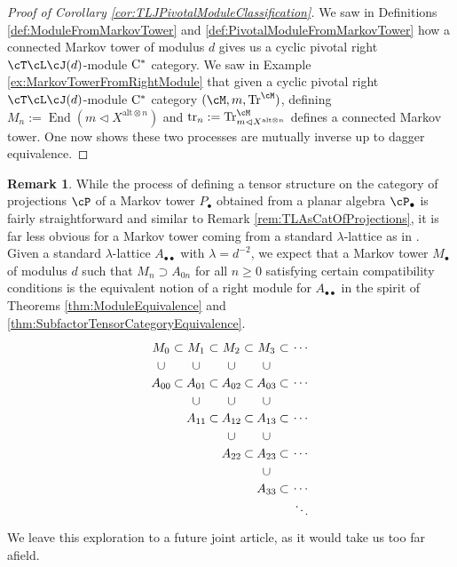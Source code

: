 \documentclass[11pt]{article}
\theoremstyle{plain}
\theoremstyle{definition}
\newtheorem{rem}[thm]{Remark}
\DeclareMathOperator{\End}{End}
\DeclareMathOperator{\Tr}{Tr}
\DeclareMathOperator{\tr}{tr}
\newcommand{\Cstar}{\rm{C^*}}
\begin{document}
\begin{proof}[Proof of Corollary \ref{cor:TLJPivotalModuleClassification}]
We saw in Definitions \ref{def:ModuleFromMarkovTower} and \ref{def:PivotalModuleFromMarkovTower} how a connected Markov tower of modulus $d$ gives us a cyclic pivotal right $\cT\cL\cJ(d)$-module $\Cstar$ category.
We saw in Example \ref{ex:MarkovTowerFromRightModule} that given a cyclic pivotal right $\cT\cL\cJ(d)$-module $\Cstar$ category $(\cM, m,\Tr^\cM)$, 
defining $M_n := \End(m \vartriangleleft X^{\text{alt}\otimes n})$ and $\tr_n := \Tr^\cM_{m \vartriangleleft X^{\text{alt}\otimes n}}$ defines a connected Markov tower.
One now shows these two processes are mutually inverse up to dagger equivalence.
\end{proof}


\begin{rem}
\label{rem:LambdaLatticeModule}
While the process of defining a tensor structure on the category of projections $\cP$ of a Markov tower $P_\bullet$ obtained from a planar algebra $\cP_\bullet$ is fairly straightforward and similar to Remark \ref{rem:TLAsCatOfProjections}, 
it is far less obvious for a Markov tower coming from a standard $\lambda$-lattice as in \cite{MR1334479}.
Given a standard $\lambda$-lattice $A_{\bullet\bullet}$ with $\lambda = d^{-2}$, we expect that a Markov tower $M_\bullet$ of modulus $d$ such that $M_n \supset A_{0n}$ for all $n\geq 0$ satisfying certain compatibility conditions is the equivalent notion of a right module for $A_{\bullet\bullet}$ in the spirit of Theorems \ref{thm:ModuleEquivalence} and \ref{thm:SubfactorTensorCategoryEquivalence}.
$$
\begin{tikzpicture}
 \node at (0,1) {$M_{0}$};
 \node at (.5,1) {$\subset$};
 \node at (1,1) {$M_{1}$};
 \node at (1.5,1) {$\subset$};
 \node at (2,1) {$M_{2}$};
 \node at (2.5,1) {$\subset$};
 \node at (3,1) {$M_{3}$};
 \node at (3.5,1) {$\subset$};
 \node at (4,1) {$\cdots$};
%
 \node at (0,.5) {$\cup$};
 \node at (1,.5) {$\cup$};
 \node at (2,.5) {$\cup$};
 \node at (3,.5) {$\cup$};
%
 \node at (0,0) {$A_{00}$};
 \node at (.5,0) {$\subset$};
 \node at (1,0) {$A_{01}$};
 \node at (1.5,0) {$\subset$};
 \node at (2,0) {$A_{02}$};
 \node at (2.5,0) {$\subset$};
 \node at (3,0) {$A_{03}$};
 \node at (3.5,0) {$\subset$};
 \node at (4,0) {$\cdots$};
%
 \node at (1,-.5) {$\cup$};
 \node at (2,-.5) {$\cup$};
 \node at (3,-.5) {$\cup$};
%
 \node at (1,-1) {$A_{11}$};
 \node at (1.5,-1) {$\subset$};
 \node at (2,-1) {$A_{12}$};
 \node at (2.5,-1) {$\subset$};
 \node at (3,-1) {$A_{13}$};
 \node at (3.5,-1) {$\subset$};
 \node at (4,-1) {$\cdots$};
%
 \node at (2,-1.5) {$\cup$};
 \node at (3,-1.5) {$\cup$};
%
 \node at (2,-2) {$A_{22}$};
 \node at (2.5,-2) {$\subset$};
 \node at (3,-2) {$A_{23}$};
 \node at (3.5,-2) {$\subset$};
 \node at (4,-2) {$\cdots$};
%
 \node at (3,-2.5) {$\cup$};
%
 \node at (3,-3) {$A_{33}$};
 \node at (3.5,-3) {$\subset$};
 \node at (4,-3) {$\cdots$};
%
 \node at (4,-3.5) {$\ddots$};
\end{tikzpicture}
$$
We leave this exploration to a future joint article, as it would take us too far afield.
\end{rem}
\end{document}
